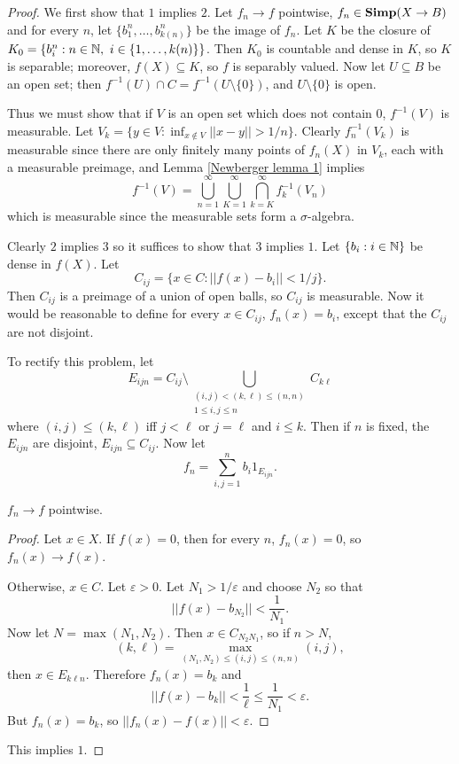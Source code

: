 \begin{proof}
We first show that $1$ implies $2$.
Let $f_n \to f$ pointwise, $f_n \in \mathbf{Simp}(X \to B)$ and for every $n$, let $\{b_1^n, \dots, b_{k(n)}^n\}$ be the image of $f_n$.
Let $K$ be the closure of $K_0 = \{b_i^n: n \in \mathbb{N},~i \in \{1, \dots, k(n)\}\}$.
Then $K_0$ is countable and dense in $K$, so $K$ is separable; moreover, $f(X) \subseteq K$, so $f$ is separably valued.
Now let $U \subseteq B$ be an open set; then $f^{-1}(U) \cap C = f^{-1}(U \setminus \{0\})$, and $U \setminus \{0\}$ is open.

Thus we must show that if $V$ is an open set which does not contain $0$, $f^{-1}(V)$ is measurable. Let $V_k = \{y \in V: \inf_{x \notin V} ||x - y|| > 1/n\}$. Clearly $f_n^{-1}(V_k)$ is measurable since there are only finitely many points of $f_n(X)$ in $V_k$, each with a measurable preimage, and Lemma \ref{Newberger lemma 1} implies
\[f^{-1}(V) = \bigcup_{n=1}^\infty \bigcup_{K=1}^\infty \bigcap_{k=K}^\infty f_k^{-1}(V_n)\]
which is measurable since the measurable sets form a $\sigma$-algebra.

Clearly $2$ implies $3$ so it suffices to show that $3$ implies $1$.
Let $\{b_i: i \in \mathbb{N}\}$ be dense in $f(X)$.
Let
\[C_{ij} = \{x \in C: ||f(x) - b_i|| < 1/j\}.\]
Then $C_{ij}$ is a preimage of a union of open balls, so $C_{ij}$ is measurable.
Now it would be reasonable to define for every $x \in C_{ij}$, $f_n(x) = b_i$, except that the $C_{ij}$ are not disjoint.

To rectify this problem, let
\[E_{ijn} = C_{ij} \setminus \bigcup_{\substack{(i,j) < (k, \ell) \leq (n, n)\\1 \leq i,j \leq n}} C_{k\ell}\]
where $(i, j) \leq (k, \ell)$ iff $j < \ell$ or $j = \ell$ and $i \leq k$.
Then if $n$ is fixed, the $E_{ijn}$ are disjoint, $E_{ijn} \subseteq C_{ij}$.
Now let
\[f_n = \sum_{i,j=1}^n b_i 1_{E_{ijn}}.\]
\begin{sublemma}
$f_n \to f$ pointwise.
\end{sublemma}
\begin{proof}
Let $x \in X$. If $f(x) = 0$, then for every $n$, $f_n(x) = 0$, so $f_n(x) \to f(x)$.

Otherwise, $x \in C$. Let $\varepsilon > 0$. Let $N_1 > 1/\varepsilon$ and choose $N_2$ so that
\[||f(x) - b_{N_2}|| < \frac{1}{N_1}.\]
Now let $N = \max(N_1, N_2)$. Then $x \in C_{N_2N_1}$, so if $n > N$,
\[(k, \ell) = \max_{(N_1, N_2) \leq (i, j) \leq (n, n)} (i,j),\]
then $x \in E_{k\ell n}$. Therefore $f_n(x) = b_k$ and
\[||f(x) - b_k|| < \frac{1}{\ell} \leq \frac{1}{N_1} < \varepsilon.\]
But $f_n(x) = b_k$, so $||f_n(x) - f(x)|| < \varepsilon$.
\end{proof}
This implies $1$.
\end{proof}


